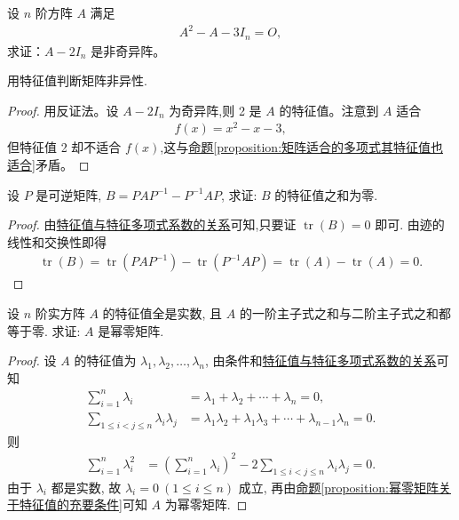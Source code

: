 \documentclass[../../main.tex]{subfiles}
\begin{document}
\begin{example}
设 \(n\) 阶方阵 \(A\) 满足 
\begin{align*}
A^2 - A - 3I_n = O,
\end{align*}
求证：\(A - 2I_n\) 是非奇异阵。
\end{example}
\begin{note}
用特征值判断矩阵非异性.
\end{note}
\begin{proof}
用反证法。设 \(A - 2I_n\) 为奇异阵,则 2 是 \(A\) 的特征值。注意到 \(A\) 适合 
\begin{align*}
f(x) = x^2 - x - 3,
\end{align*}
但特征值 2 却不适合 \(f(x)\),这与\hyperref[proposition:矩阵适合的多项式其特征值也适合]{命题\ref{proposition:矩阵适合的多项式其特征值也适合}}矛盾。

\end{proof}

\begin{example}
设 $P$ 是可逆矩阵, $B = PAP^{-1} - P^{-1}AP$, 求证: $B$ 的特征值之和为零.
\end{example}
\begin{proof}
由\hyperref[proposition:特征值与特征多项式系数的关系]{特征值与特征多项式系数的关系}可知,只要证 $\operatorname{tr}(B) = 0$ 即可. 由迹的线性和交换性即得
\begin{align*}
\operatorname{tr}(B) = \operatorname{tr}(PAP^{-1}) - \operatorname{tr}(P^{-1}AP) 
= \operatorname{tr}(A) - \operatorname{tr}(A) = 0.
\end{align*}

\end{proof}

\begin{example}
设 $n$ 阶实方阵 $A$ 的特征值全是实数, 且 $A$ 的一阶主子式之和与二阶主子式之和都等于零. 求证: $A$ 是幂零矩阵.
\end{example}
\begin{proof}
设 $A$ 的特征值为 $\lambda_1, \lambda_2, \dots, \lambda_n$, 由条件和\hyperref[proposition:特征值与特征多项式系数的关系]{特征值与特征多项式系数的关系}可知
\begin{align*}
\sum_{i=1}^n \lambda_i &= \lambda_1 + \lambda_2 + \cdots + \lambda_n = 0, \\
\sum_{1 \leqslant  i < j \leqslant  n} \lambda_i \lambda_j &= \lambda_1 \lambda_2 + \lambda_1 \lambda_3 + \cdots + \lambda_{n-1} \lambda_n = 0.
\end{align*}
则
\begin{align*}
\sum_{i=1}^n \lambda_i^2 &= \left( \sum_{i=1}^n \lambda_i \right)^2 - 2 \sum_{1 \leqslant  i < j \leqslant  n} \lambda_i \lambda_j = 0.
\end{align*}
由于 $\lambda_i$ 都是实数, 故 $\lambda_i = 0 \ (1 \leqslant  i \leqslant  n)$ 成立, 再由\hyperref[proposition:幂零矩阵关于特征值的充要条件]{命题\ref{proposition:幂零矩阵关于特征值的充要条件}}可知 $A$ 为幂零矩阵.

\end{proof}
\end{document}

